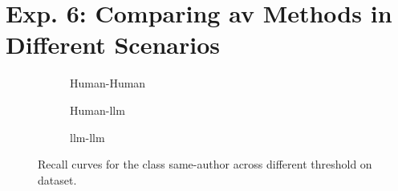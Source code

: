 \section{Exp. 6: Comparing \acs{av} Methods in Different Scenarios}
\label{sec:app_detection_scenarios}

%     


\begin{figure}[htbp]
  \centering
  \begin{subfigure}[b]{0.52\textwidth}
    \centering
    
    \caption{Human-Human}
    \label{fig:detec_scen_human-human_recall}
  \end{subfigure}
  \hfill
  \begin{subfigure}[b]{0.52\textwidth}
    \centering
    
    \caption{Human-\ac{llm}}
    \label{fig:detec_scen_human-llm_recall}
  \end{subfigure}
  \hfill
  \begin{subfigure}[b]{0.52\textwidth}
    \centering
    
    \caption{\ac{llm}-\ac{llm}}
    \label{fig:detec_scen_llm-llm_recall}
    \end{subfigure}
  \caption[Recall curves on \dataArtificialStudent{} dataset.]{Recall curves for the class same-author across different threshold on \dataArtificialStudent{} dataset.}
  \label{fig:detec_scen_recall}
\end{figure}
